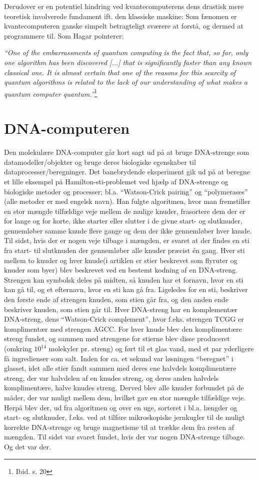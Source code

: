 \documentclass[10pt,a4paper]{article}
\newcommand{\citat}[2]{\begin{justify}\textit{``#1''}\hspace{0.1cm}\footnote{#2}\end{justify}}
\begin{document}
Derudover er en potentiel hindring ved kvantecomputerens dens drastisk mere 
teoretisk involverede fundament ift. den klassiske maskine:  
Som fænomen er kvantecomputeren ganske simpelt betragteligt sværere at forstå, 
og dermed at programmere til.
Som Hagar pointerer: 
\citat{One of the embarrassments of quantum computing is the fact that, so far, 
only one algorithm has been discovered [...] that is significantly faster than 
any \textit{known} classical one. It is almost certain that one of the reasons for
this scarcity of quantum algorithms is related to the lack of our understanding
of what makes a quantum computer quantum.}{Ibid. s. 20}


\section{DNA-computeren}
Den molekulære DNA-computer går kort sagt ud på at bruge DNA-strenge som 
datamodeller/objekter og bruge deres biologiske egenskaber til 
dataprocesser/beregninger.
Det banebrydende eksperiment gik ud på at beregne et lille eksempel på 
Hamilton-sti-problemet ved hjælp af DNA-strenge og biologiske metoder og 
processer; bl.a. ``Watson-Crick pairing'' og ``polymerases'' (alle metoder er
med engelsk navn). Han fulgte algoritmen, hvor man fremstiller en stor mængde
tilfældige veje mellem de mulige knuder, frasortere dem der er for lange og for
korte, ikke starter eller slutter i de givne start- og slutknuder, gennemløber
samme knude flere gange og dem der ikke gennemløber hver knude. Til sidst, hvis
der er nogen veje tilbage i mængden, er svaret at der findes en sti fra start-
til slutknuden der gennemløber alle knuder præcist én gang.
Hver sti mellem to knuder og hver knude(i artiklen er stier beskrevet som flyruter og knuder 
som byer) blev beskrevet ved en bestemt kodning af en DNA-streng. 
Strengen kan symbolsk deles på midten, så knuden har et fornavn, hvor en sti kan
gå til, og et efternavn, hvor en sti kan gå fra. Ligeledes for en sti, beskriver
den første ende af strengen knuden, som stien går fra, og den anden ende
beskriver knuden, som stien går til. Hver DNA-streng har en komplementær
DNA-streng, dens ``Watson-Crick complement'', hvor f.eks. strengen TCGG er
komplimentær med strengen AGCC. For hver knude blev den komplimentære streng
fundet, og sammen med strengene for stierne blev disse produceret (omkring
$10^{14}$ molekyler pr. streng) og ført til et glas vand, med et par yderligere
få ingredienser som salt. Inden for ca. et sekund var løsningen ``beregnet'' i
glasset, idet alle stier fandt sammen med deres ene halvdels komplimentære
streng, der var halvdelen af en knudes streng, og deres anden halvdels
komplimentære, halve knudes streng. Derved blev alle knuder forbundet på de
måder, der var muligt mellem dem, hvilket gav en stor mængde tilfældige veje.
Herpå blev der, ud fra algoritmen og over en uge, sorteret i bl.a. længder og
start- og slutknuder, f.eks. ved at tilføre mikroskopiske jernkugler til de
muligt korrekte DNA-strenge og bruge magnetisme til at trække dem fra resten af
mængden. Til sidst var svaret fundet, hvis der var nogen DNA-strenge tilbage. Og
det var der.
\end{document}
